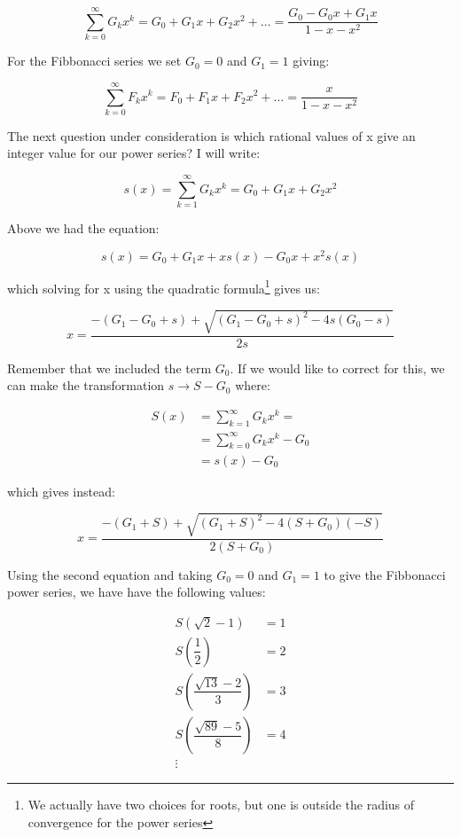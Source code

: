 \documentclass[12pt]{article}
\begin{document}
$$
\sum_{k=0}^\infty G_k x^k = G_0 + G_1 x + G_2 x^2 + \dots =  \dfrac{G_0 - G_0 x + G_1 x}{1 - x - x^2}
$$

For the Fibbonacci series we set $G_0 = 0$ and $G_1 = 1$ giving:

$$
\sum_{k=0}^\infty F_k x^k = F_0 + F_1 x + F_2 x^2 + \dots =  \dfrac{x}{1 - x - x^2}
$$


\newpage

The next question under consideration is which rational values of x give an integer value for our power series? I will write:

$$
s(x) = \sum_{k=1}^\infty G_k x^k = G_0 + G_1 x + G_2 x^2
$$

Above we had the equation:

$$
s(x) =  G_0 + G_1 x + xs(x) - G_0 x + x^2 s(x)
$$ 

which solving for x using the quadratic formula\footnote{We actually have two choices for roots, but one is outside the radius of convergence for the power series} gives us:

$$
x = \dfrac{-(G_1 - G_0 + s) + \sqrt{(G_1 - G_0 + s)^2 - 4s(G_0-s)}}{2s}
$$

Remember that we included the term $G_0$. If we would like to correct for this, we can make the transformation $s \rightarrow S - G_0$ where:

\begin{align*}
S(x)&= \sum_{k=1}^\infty G_k x^k = \\
       &= \sum_{k=0}^\infty G_k x^k - G_0\\
       &= s(x) - G_0
\end{align*}

which gives instead:

$$
x = \dfrac{-(G_1 + S) + \sqrt{(G_1 + S)^2 - 4(S + G_0)(-S)}}{2(S + G_0)}
$$

\newpage

Using the second equation and taking $G_0 = 0$ and $G_1 = 1$ to give the Fibbonacci power series, we have have the following values:

\begin{align*}
S\left(\sqrt{2} -1\right) &= 1\\
S\left(\dfrac{1}{2}\right) &= 2\\
S\left(\dfrac{\sqrt{13} - 2}{3}\right) &= 3\\
S\left(\dfrac{\sqrt{89} - 5}{8}\right) &= 4\\
\vdots
\end{align*}
\end{document}
